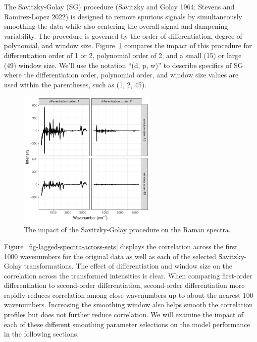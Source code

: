 \documentclass[
  letterpaper,
  DIV=11,
  numbers=noendperiod]{scrartcl}
\begin{document}
The Savitzky-Golay (SG) procedure (Savitzky and Golay 1964; Stevens and
Ramirez-Lopez 2022) is designed to remove spurious signals by
simultaneously smoothing the data while also centering the overall
signal and dampening variability. The procedure is governed by the order
of differentiation, degree of polynomial, and window size.
Figure~\ref{fig-sg-filtering} compares the impact of this procedure for
differentiation order of 1 or 2, polynomial order of 2, and a small (15)
or large (49) window size. We'll use the notation ``(d, p, w)'' to
describe specifics of SG where the differentiation order, polynomial
order, and window size values are used within the parentheses, such as
(1, 2, 45).

\begin{figure}[t!]

{\centering \includegraphics[width=0.6\textwidth,height=\textheight]{figures/fig-sg-filtering-1.pdf}

}

\caption{\label{fig-sg-filtering}The impact of the Savitzky-Golay
procedure on the Raman spectra.}

\end{figure}

Figure~\ref{fig-lagged-spectra-across-sets} displays the correlation
across the first 1000 wavenumbers for the original data as well as each
of the selected Savitzky-Golay transformations. The effect of
differentiation and window size on the correlation across the
transformed intensities is clear. When comparing first-order
differentiation to second-order differentiation, second-order
differentiation more rapidly reduces correlation among close wavenumbers
up to about the nearest 100 wavenumbers. Increasing the smoothing window
also helps smooth the correlation profiles but does not further reduce
correlation. We will examine the impact of each of these different
smoothing parameter selections on the model performance in the following
sections.
\end{document}
